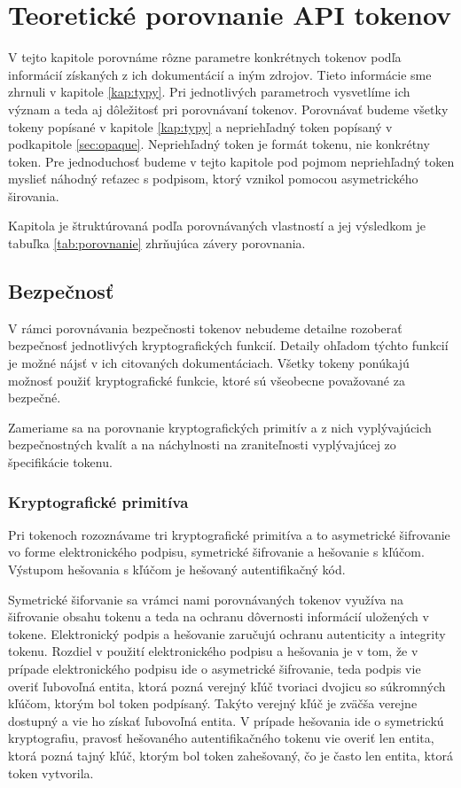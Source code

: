 \chapter{Teoretické porovnanie API tokenov}

\label{kap:teoreticke} %

V tejto kapitole porovnáme rôzne parametre konkrétnych tokenov podľa informácií získaných z ich dokumentácií a iným zdrojov. Tieto informácie sme zhrnuli v kapitole \ref{kap:typy}. Pri jednotlivých parametroch vysvetlíme ich význam a teda aj dôležitosť pri porovnávaní tokenov. Porovnávať budeme všetky tokeny popísané v kapitole \ref{kap:typy} a nepriehľadný token popísaný v podkapitole \ref{sec:opaque}. Nepriehľadný token je formát tokenu, nie konkrétny token. Pre jednoduchosť budeme v tejto kapitole pod pojmom nepriehľadný token myslieť náhodný reťazec s podpisom, ktorý vznikol pomocou asymetrického širovania. 

Kapitola je štruktúrovaná podľa porovnávaných vlastností a jej výsledkom je tabuľka \ref{tab:porovnanie} zhrňujúca závery porovnania.

\section{Bezpečnosť}

V rámci porovnávania bezpečnosti tokenov nebudeme detailne rozoberať bezpečnosť jednotlivých kryptografických funkcií. Detaily ohľadom týchto funkcií je možné nájsť v ich citovaných dokumentáciach. Všetky tokeny ponúkajú možnosť použiť kryptografické funkcie, ktoré sú všeobecne považované za bezpečné.

Zameriame sa na porovnanie kryptografických primitív a z nich vyplývajúcich bezpečnostných kvalít a na náchylnosti na zraniteľnosti vyplývajúcej zo špecifikácie tokenu.

\subsection{Kryptografické primitíva}

Pri tokenoch rozoznávame tri kryptografické primitíva a to asymetrické šifrovanie vo forme elektronického podpisu, symetrické šifrovanie a hešovanie s kľúčom. Výstupom hešovania s kľúčom je hešovaný autentifikačný kód. 

Symetrické šiforvanie sa vrámci nami porovnávaných tokenov využíva na šifrovanie obsahu tokenu a teda na ochranu dôvernosti informácií uložených v tokene. Elektronický podpis a hešovanie zaručujú ochranu autenticity a integrity tokenu. Rozdiel v použití elektronického podpisu a hešovania je v tom, že v prípade elektronického podpisu ide o asymetrické šifrovanie, teda  podpis vie overiť ľubovoľná entita, ktorá pozná verejný kľúč tvoriaci dvojicu so súkromných kľúčom, ktorým bol token podpísaný. Takýto verejný kľúč je zväčša verejne dostupný a vie ho získať ľubovoľná entita. V prípade hešovania ide o symetrickú kryptografiu, pravosť hešovaného autentifikačného tokenu vie overiť len entita, ktorá pozná tajný kľúč, ktorým bol token zahešovaný, čo je často len entita, ktorá token vytvorila.

